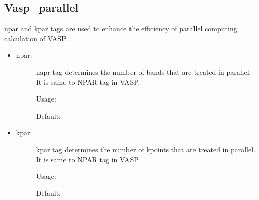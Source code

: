 \documentclass[letterpaper,10pt,english]{sphinxmanual}
\begin{document}
\subsection{Vasp\_parallel}
\label{\detokenize{Input/Configuration:vasp-parallel}}
npar and kpar tags are used to enhance the efficiency of parallel computing calculation of VASP.
\begin{itemize}
\item {} \begin{description}
\item[{npar:}] \leavevmode
napr tag determines the number of bands that are treated in parallel. It is same to NPAR tag in VASP.

Usage:

\begin{sphinxVerbatim}[commandchars=\\\{\}]
   \PYG{p}{[}\PYG{p}{]}
\end{sphinxVerbatim}

Default:

\begin{sphinxVerbatim}[commandchars=\\\{\}]
   
\end{sphinxVerbatim}

\end{description}

\item {} \begin{description}
\item[{kpar:}] \leavevmode
kpar tag determines the number of kpoints that are treated in parallel. It is same to NPAR tag in VASP.

Usage:

\begin{sphinxVerbatim}[commandchars=\\\{\}]
   \PYG{p}{[}\PYG{p}{]}
\end{sphinxVerbatim}

Default:

\begin{sphinxVerbatim}[commandchars=\\\{\}]
   
\end{sphinxVerbatim}

\end{description}

\end{itemize}
\end{document}
